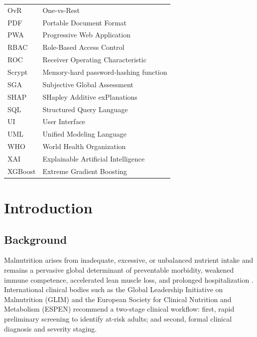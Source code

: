 \documentclass[12pt,a4paper]{report}
\begin{document}
\begin{longtable}{@{}p{}p{}@{}}
OvR & One-vs-Rest \\
PDF & Portable Document Format \\
PWA & Progressive Web Application \\
RBAC & Role-Based Access Control \\
ROC & Receiver Operating Characteristic \\
Scrypt & Memory-hard password-hashing function \\
SGA & Subjective Global Assessment \\
SHAP & SHapley Additive exPlanations \\
SQL & Structured Query Language \\
UI & User Interface \\
UML & Unified Modeling Language \\
WHO & World Health Organization \\
XAI & Explainable Artificial Intelligence \\
XGBoost & Extreme Gradient Boosting \\
\bottomrule
\end{longtable}
\newpage


\chapter{Introduction}

\section{Background}
Malnutrition arises from inadequate, excessive, or unbalanced nutrient intake and remains a pervasive global determinant of preventable morbidity, weakened immune competence, accelerated lean muscle loss, and prolonged hospitalization \cite{fao2023sofi, unicef2021malnutrition}. International clinical bodies such as the Global Leadership Initiative on Malnutrition (GLIM) \cite{cederholm2019glim} and the European Society for Clinical Nutrition and Metabolism (ESPEN) \cite{kondrup2003espen} recommend a two-stage clinical workflow: first, rapid preliminary screening to identify at-risk adults; and second, formal clinical diagnosis and severity staging.
\end{document}
